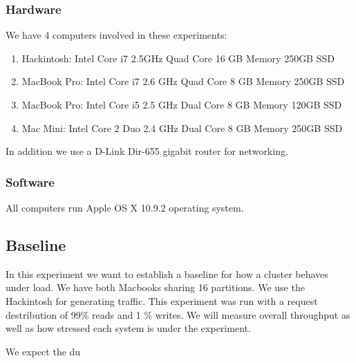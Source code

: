 \subsubsection{Hardware}
We have 4 computers involved in these experiments:
\begin{enumerate}
\item Hackintosh: Intel Core i7 2.5GHz Quad Core  16 GB Memory 250GB SSD
\item MacBook Pro: Intel Core i7 2.6 GHz Quad Core 8 GB Memory 250GB SSD
\item MacBook Pro: Intel Core i5 2.5 GHz Dual Core 8 GB Memory 120GB SSD
\item Mac Mini: Intel Core 2 Duo 2.4 GHz Dual Core 8 GB Memory 250GB SSD
\end{enumerate}

In addition we use a D-Link Dir-655 gigabit router for networking.

\subsubsection{Software}
All computers run Apple OS X 10.9.2 operating system. 

\subsection{Baseline}
In this experiment we want to establish a baseline for how a cluster behaves under load. We have both Macbooks sharing 16 partitions. We use the Hackintosh for generating traffic. This experiment was run with a request destribution of 99\% reads and 1 \% writes. We will measure overall throughput as well as how stressed each system is under the experiment.

We expect the du








